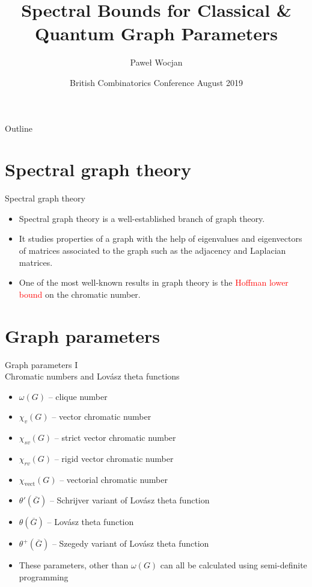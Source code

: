 \documentclass{beamer}
\title[Spectral Bounds]{Spectral Bounds for Classical \& Quantum Graph Parameters}
\author{Pawe{\l} Wocjan}
\institute{University of Central Florida}
\date{British Combinatorics Conference August 2019}
\renewcommand{\>}{\rangle}
\newcommand{\<}{\langle}
\begin{document}
\begin{frame}
  \titlepage
\end{frame}

\begin{frame}{Outline}
  \tableofcontents
\end{frame}

\section{Spectral graph theory}

\begin{frame}{Spectral graph theory}
\begin{itemize}
\item Spectral graph theory is a well-established branch of graph theory.

\item It studies properties of a graph with the help of eigenvalues and eigenvectors of matrices associated to the graph such as the adjacency and Laplacian matrices.

\item One of the most well-known results in graph theory is the \textcolor{red}{Hoffman lower bound} on the chromatic number.
\end{itemize}
\end{frame}

\section{Graph parameters}

\begin{frame}{Graph parameters I \\ Chromatic numbers and Lov\'asz theta functions}
\begin{itemize}
\item $\omega(G)$ -- clique number
\item $\chi_v(G)$ -- vector chromatic number
\item $\chi_{sv}(G)$ -- strict vector chromatic number
\item $\chi_{rv}(G)$ -- rigid vector chromatic number
\item $\chi_{\mathrm{vect}}(G)$ -- vectorial chromatic number

\medskip
\item $\theta'(\overline{G})$  -- Schrijver variant of Lov\'asz theta function
\item $\theta(\overline{G})$ -- Lov\'asz theta function 
\item $\theta^+(\overline{G})$ -- Szegedy variant of Lov\'asz theta function 

\medskip
\item These parameters, other than $\omega(G)$ can all be calculated using semi-definite programming
\end{itemize}
\end{frame}
\end{document}
